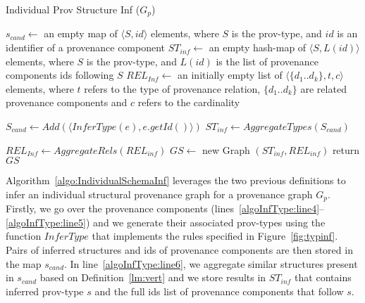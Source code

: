 \begin{algorithm}[t]
\caption{Individual Prov Structure Inf ($G_p$)}
\label{algo:IndividualSchemaInf}
    $s_{cand} \leftarrow $  an empty map of $\langle S, id \rangle$ elements,  where $S$ is the prov-type, and  $id$ is an identifier of a provenance component\;
  $ST_{inf} \leftarrow $ an empty hash-map of $\langle S,L(id) \rangle$ elements,  where $S$ is the prov-type, and  $L(id)$ is the list of provenance components ids following $S$\;
  $REL_{Inf} \leftarrow $ an initially empty list of $\langle \{d_1..d_k\},t,c \rangle$ elements,  where $t$ refers to the type of provenance relation, $\{d_1..d_k\}$ are related provenance components and $c$ refers to the cardinality  \;

{}
		 {   \label{algoInfType:line4}
 	  			  $S_{cand} \leftarrow  Add( \langle InferType(e),e.getId()  \rangle )$\; \label{algoInfType:line5}
		}
	{}	
	$ST_{inf} \leftarrow  AggregateTypes(S_{cand})$\;	 \label{algoInfType:line6}
	{}

{}
$REL_{Inf} \leftarrow  AggregateRels(REL_{inf})$\;  \label{algoInfType:line13}
$ GS  \leftarrow $ new Graph $ (ST_{inf},REL_{inf}) $\; 
return $GS$\;

\end{algorithm}


Algorithm~\ref{algo:IndividualSchemaInf} leverages the two previous definitions to infer an individual structural provenance graph for a provenance graph $G_p$.
Firstly, we go over the provenance components (lines~\ref{algoInfType:line4}--\ref{algoInfType:line5}) and we generate their associated prov-types using the function $InferType$ that implements the rules specified in Figure~\ref{fig:typinf}.
Pairs of inferred structures and ids of provenance components are then stored in the map $s_{cand}$.
In line~\ref{algoInfType:line6}, we aggregate similar structures present in $s_{cand}$ based on Definition~\ref{lm:vert} and we store results in $ST_{inf}$ that contains inferred prov-type $s$ and the full ids list of provenance components that follow $s$. 

